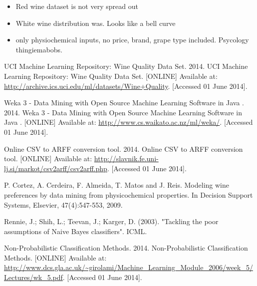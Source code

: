 \documentclass[a4paper,12pt,openany]{report}
\begin{document}
\begin{itemize}
	\item Red wine dataset is not very spread out
	\item White wine distribution was. Looks like a bell curve
	\item only physiochemical inputs, no price, brand, grape type included. Psycology thingiemabobs.
\end{itemize}

\begin{thebibliography}{10}
	UCI Machine Learning Repository: Wine Quality Data Set. 2014. UCI Machine Learning Repository: Wine Quality Data Set. [ONLINE] Available at: \url{http://archive.ics.uci.edu/ml/datasets/Wine+Quality}. [Accessed 01 June 2014].

	Weka 3 - Data Mining with Open Source Machine Learning Software in Java . 2014. Weka 3 - Data Mining with Open Source Machine Learning Software in Java . [ONLINE] Available at: \url{http://www.cs.waikato.ac.nz/ml/weka/}. [Accessed 01 June 2014].

	Online CSV to ARFF conversion tool. 2014. Online CSV to ARFF conversion tool. [ONLINE] Available at: \url{http://slavnik.fe.uni-lj.si/markot/csv2arff/csv2arff.php}. [Accessed 01 June 2014].

	P. Cortez, A. Cerdeira, F. Almeida, T. Matos and J. Reis. Modeling wine preferences by data mining from physicochemical properties. In Decision Support Systems, Elsevier, 47(4):547-553, 2009.

	Rennie, J.; Shih, L.; Teevan, J.; Karger, D. (2003). "Tackling the poor assumptions of Naive Bayes classifiers". ICML.

Non-Probabilistic Classiﬁcation Methods. 2014. Non-Probabilistic Classiﬁcation Methods. [ONLINE] Available at: \url{http://www.dcs.gla.ac.uk/~girolami/Machine_Learning_Module_2006/week_5/Lectures/wk_5.pdf}. [Accessed 01 June 2014].

\end{thebibliography}
\end{document}
